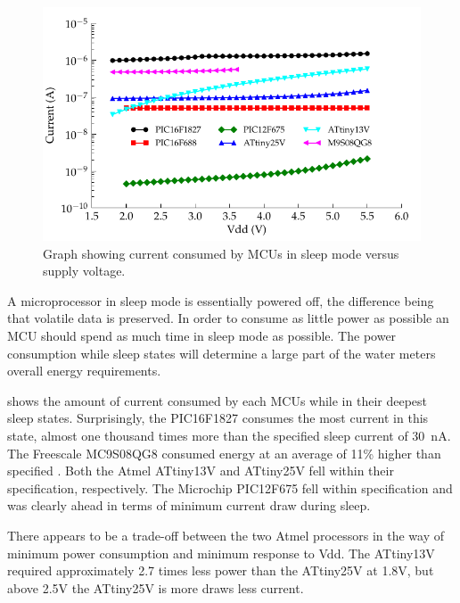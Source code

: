       \begin{figure}
        \centering
        \includegraphics{content/pt1/03-EnergyRequirements/graphics/Graph_All_Sleeping_Current}
        \caption{\label{fig:All_Sleep_Current}Graph showing current consumed by MCUs in sleep mode versus supply voltage.}
      \end{figure}

      A microprocessor in sleep mode is essentially powered off, the difference being that volatile data is preserved.
      In order to consume as little power as possible an MCU should spend as much time in sleep mode as possible.
      The power consumption while sleep states will determine a large part of the water meters overall energy requirements.

       shows the amount of current consumed by each MCUs while in their deepest sleep states.
      Surprisingly, the PIC16F1827 consumes the most current in this state, almost one thousand times more than the specified sleep current of \SI{30}{\nano\ampere}\cite{PIC16F1827}.
      The Freescale MC9S08QG8 consumed energy at an average of 11\% higher than specified \cite{MC9S08QG8}.
      Both the Atmel ATtiny13V and ATtiny25V fell within their specification, \cite{AtmelATtiny13,AtmelATtiny25} respectively.
      The Microchip PIC12F675 fell within specification\cite{PIC12F675} and was clearly ahead in terms of minimum current draw during sleep.

      There appears to be a trade-off between the two Atmel processors in the way of minimum power consumption and minimum response to Vdd.
      The ATtiny13V required approximately 2.7 times less power than the ATtiny25V at 1.8V, but above 2.5V the ATtiny25V is more draws less current.

